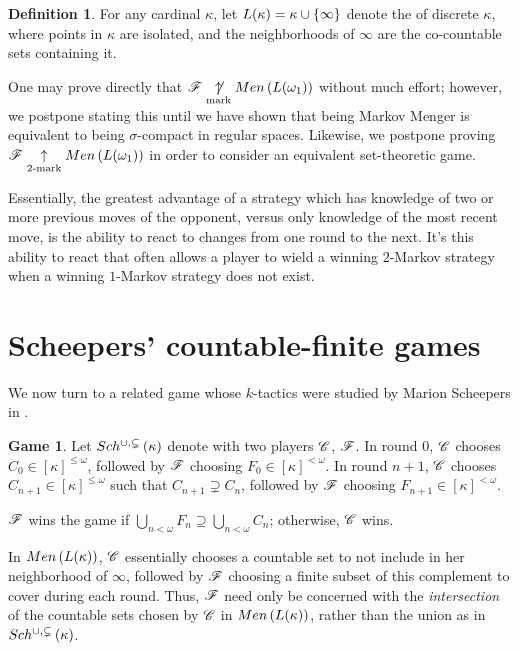 \documentclass{amsart}
\theoremstyle{definition}
\newtheorem{definition}[theorem]{Definition}
\newtheorem{game}[theorem]{Game}
\begin{document}
\begin{definition}
  For any cardinal \(\kappa\), let \(L(\kappa)=\kappa\cup\{\infty\}\) denote
  the  of discrete \(\kappa\), where points in
  \(\kappa\) are isolated, and the neighborhoods of \(\infty\) are the co-countable
  sets containing it.
\end{definition}

One may prove directly that
  \(\mathscr{F} \underset{\text{mark}}{\not\uparrow} Men\left({L(\omega_1)}\right)\)
without much effort; however, we postpone stating this until we have
shown that being Markov Menger is equivalent to being \(\sigma\)-compact
in regular spaces. Likewise, we postpone proving
  \(\mathscr{F} \underset{2\text{-mark}}{\uparrow} Men\left({L(\omega_1)}\right)\)
in order to consider an equivalent set-theoretic game.

Essentially,
the greatest advantage of a strategy which has knowledge of two or more previous
moves of the opponent, versus only knowledge of the most recent move, is the
ability to react to changes from one round to the next. It's this ability to
react that often allows a player to wield a winning \(2\)-Markov strategy when
a winning \(1\)-Markov strategy does not exist.

\section{Scheepers' countable-finite games}

We now turn to a related game whose \(k\)-tactics were studied by Marion
Scheepers in \cite{MR1129143}.

\begin{game}
  Let \(Sch^{\cup,\subsetneq}\left({\kappa}\right)\) denote
  with two players \(\mathscr{C}\), \(\mathscr{F}\). In round \(0\), \(\mathscr{C}\) chooses
  \(C_0\in[\kappa]^{\leq\omega}\), followed by \(\mathscr{F}\) choosing
  \(F_0\in[\kappa]^{<\omega}\). In round \(n+1\), \(\mathscr{C}\) chooses
  \(C_{n+1}\in[\kappa]^{\leq\omega}\) such that \(C_{n+1}\supsetneq C_n\),
  followed by \(\mathscr{F}\) choosing \(F_{n+1}\in[\kappa]^{<\omega}\).

  \(\mathscr{F}\) wins the game if
  \(\bigcup_{n<\omega} F_n\supseteq\bigcup_{n<\omega} C_n\); otherwise,
  \(\mathscr{C}\) wins.
\end{game}

In \(Men\left({L(\kappa)}\right)\), \(\mathscr{C}\) essentially chooses a countable set
to not include in her neighborhood of \(\infty\), followed by \(\mathscr{F}\) choosing
a finite subset of this complement to cover during each round. Thus,
\(\mathscr{F}\) need only be concerned with the \textit{intersection} of the
countable sets chosen by \(\mathscr{C}\) in \(Men\left({L(\kappa)}\right)\), rather
than the union as in \(Sch^{\cup,\subsetneq}\left({\kappa}\right)\).
\end{document}
